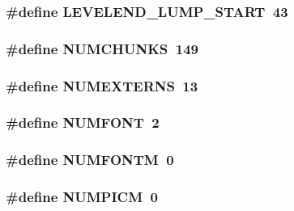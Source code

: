 \label{GFXV__WL6_8H_a01e5f4d5f8e05beb4315b9ad907e06e7}
\hypertarget{GFXV__WL6_8H_a1895eb960cb12bb7b49bf322e79d6c80}{
\subsubsection[{LEVELEND\_\-LUMP\_\-START}]{\setlength{\rightskip}{0pt plus 5cm}\#define LEVELEND\_\-LUMP\_\-START~43}}
\label{GFXV__WL6_8H_a1895eb960cb12bb7b49bf322e79d6c80}
\hypertarget{GFXV__WL6_8H_a06c8b188cc3cdd25a5451beeefddfa66}{
\subsubsection[{NUMCHUNKS}]{\setlength{\rightskip}{0pt plus 5cm}\#define NUMCHUNKS~149}}
\label{GFXV__WL6_8H_a06c8b188cc3cdd25a5451beeefddfa66}
\hypertarget{GFXV__WL6_8H_abb86554baf24d8863e54bf20d68120b5}{
\subsubsection[{NUMEXTERNS}]{\setlength{\rightskip}{0pt plus 5cm}\#define NUMEXTERNS~13}}
\label{GFXV__WL6_8H_abb86554baf24d8863e54bf20d68120b5}
\hypertarget{GFXV__WL6_8H_a7686ac8ed1dbf71ebee2b4711dae0edd}{
\subsubsection[{NUMFONT}]{\setlength{\rightskip}{0pt plus 5cm}\#define NUMFONT~2}}
\label{GFXV__WL6_8H_a7686ac8ed1dbf71ebee2b4711dae0edd}
\hypertarget{GFXV__WL6_8H_afd7a523b060f425fd737a94c044892ac}{
\subsubsection[{NUMFONTM}]{\setlength{\rightskip}{0pt plus 5cm}\#define NUMFONTM~0}}
\label{GFXV__WL6_8H_afd7a523b060f425fd737a94c044892ac}
\hypertarget{GFXV__WL6_8H_a2eb878497ab6b2a4f80015a218f38c8f}{
\subsubsection[{NUMPICM}]{\setlength{\rightskip}{0pt plus 5cm}\#define NUMPICM~0}}
